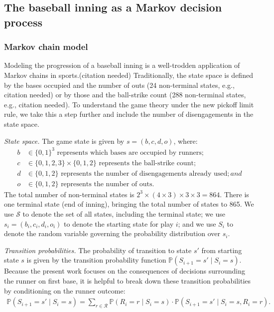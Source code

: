 \documentclass{article}
\begin{document}
    \subsection{The baseball inning as a Markov decision process}

      \subsubsection{Markov chain model}

        Modeling the progression of a baseball inning is a well-trodden application of Markov chains in sports.(citation needed) Traditionally, the state space is defined by the bases occupied and the number of outs (24 non-terminal states, e.g., citation needed) or by those and the ball-strike count (288 non-terminal states, e.g., citation needed). To understand the game theory under the new pickoff limit rule, we take this a step further and include the number of disengagements in the state space.
      
        {\it State space.} The game state is given by $s = (b, c, d, o)$, where:
        \begin{align*}
          b &\in \{0, 1\}^3 \mbox{ represents which bases are occupied by runners};\\
          c &\in \{0, 1, 2, 3\} \times \{0, 1, 2\} \mbox{ represents the ball-strike count};\\
          d &\in \{0, 1, 2\} \mbox{ represents the number of disengagements already used}; and\\
          o &\in \{0, 1, 2\} \mbox{ represents the number of outs}.
        \end{align*}
        The total number of non-terminal states is $2^3 \times (4 \times 3) \times 3 \times 3 = 864$. There is one terminal state (end of inning), bringing the total number of states to 865. We use $\mathcal{S}$ to denote the set of all states, including the terminal state; we use $s_i = (b_i, c_i, d_i, o_i)$ to denote the starting state for play $i$; and we use $S_i$ to denote the random variable governing the probability distribution over $s_i$.
  
        {\it Transition probabilities.} The probability of transition to state $s'$ from starting state $s$ is given by the transition probability function $\mathbb{P}(S_{i+1} = s' \mid S_i = s)$. Because the present work focuses on the consequences of decisions surrounding the runner on first base, it is helpful to break down these transition probabilities by conditioning on the runner outcome:
        \begin{align}
          \label{eqn:transition-prob}
          \mathbb{P}(S_{i+1} = s' \mid S_i = s) = \sum_{r \in \mathcal{R}} \mathbb{P}(R_i = r \mid S_i = s) \cdot \mathbb{P}(S_{i+1} = s' \mid S_i = s, R_i = r).
        \end{align}
\end{document}
